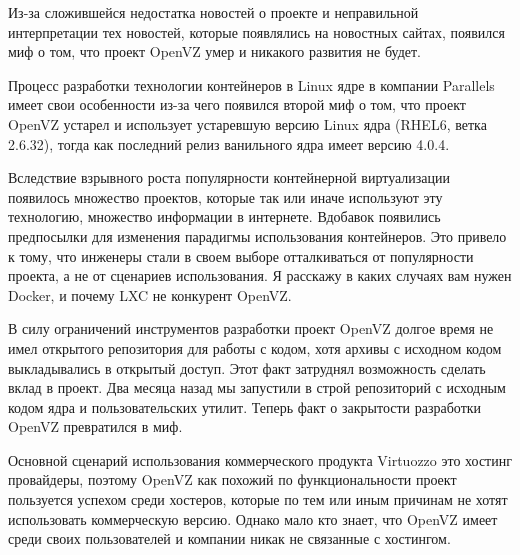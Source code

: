 \documentclass[10pt, a5paper]{article}
\begin{document}
Из-за сложившейся недостатка новостей о проекте и неправильной интерпретации тех новостей, которые появлялись на новостных сайтах, появился миф о том, что проект OpenVZ умер и никакого развития не будет.

Процесс разработки технологии контейнеров в Linux ядре в компании Parallels имеет свои особенности из-за чего появился второй миф о том, что проект OpenVZ устарел и использует устаревшую версию Linux ядра (RHEL6, ветка 2.6.32), тогда как последний релиз ванильного ядра имеет версию 4.0.4.

Вследствие взрывного роста популярности контейнерной виртуализации появилось множество проектов, которые так или иначе используют эту технологию, множество информации в интернете. Вдобавок появились предпосылки для изменения парадигмы использования контейнеров. Это привело к тому, что инженеры стали в своем выборе отталкиваться от популярности проекта, а не от сценариев использования. Я расскажу в каких случаях вам нужен Docker, и почему LXC не конкурент OpenVZ.

В силу ограничений инструментов разработки проект OpenVZ долгое время не имел открытого репозитория для работы с кодом, хотя архивы с исходном кодом выкладывались в открытый доступ. Этот факт затруднял возможность сделать вклад в проект. Два месяца назад мы запустили в строй репозиторий с исходным кодом ядра и пользовательских утилит. Теперь факт о закрытости разработки OpenVZ превратился в миф.

Основной сценарий использования коммерческого продукта \linebreak Virtuozzo это хостинг провайдеры, поэтому OpenVZ как похожий по функциональности проект пользуется успехом среди хостеров, которые по тем или иным причинам не хотят использовать коммерческую версию. Однако мало кто знает, что OpenVZ имеет среди своих пользователей и компании никак не связанные с хостингом. 
\end{document}
